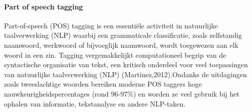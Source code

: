 \paragraph{Part of speech tagging}
Part-of-speech (POS) tagging is een essentiële activiteit in natuurlijke taalverwerking (NLP) waarbij een grammaticale classificatie, zoals zelfstandig naamwoord, werkwoord of bijvoeglijk naamwoord, wordt toegewezen aan elk woord in een zin. Tagging vergemakkelijkt computationeel begrip van de syntactische organisatie van tekst, een kritisch onderdeel voor veel toepassingen van natuurlijke taalverwerking (NLP) (Martinez,2012).Ondanks de uitdagingen zoals tweeslachtige woorden bereiken moderne POS taggers hoge nauwkeurigheidspercentages (rond 96-97\%) en worden ze veel gebruik bij het ophalen van informatie, tekstanalyse en andere NLP-taken\autocite{Martinez2024}.

